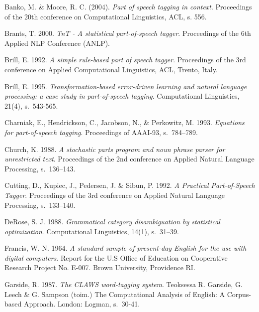 \documentclass[utf8,bachelor,manualbib]{gradu3}
\begin{document}
\begin{thebibliography}{} 

Banko, M. \& Moore, R. C. (2004). \textit{Part of speech tagging in context}. Proceedings of the 20th conference on Computational Linguistics, ACL, s. 556.

Brants, T. 2000. \textit{TnT - A statistical part-of-speech tagger}. Proceedings of the 6th Applied NLP Conference (ANLP).

Brill, E. 1992. \textit{A simple rule-based part of speech tagger}. Proceedings of the 3rd conference on Applied Computational Linguistics, ACL, Trento, Italy.

Brill, E. 1995. \textit{Transformation-based error-driven learning and natural language processing: a case study in part-of-speech tagging}. Computational Linguistics, 21(4), s.~543-565.

Charniak, E., Hendrickson, C., Jacobson, N., \& Perkowitz, M. 1993. \textit{Equations for part-of-speech tagging}. Proceedings of AAAI-93, s.~784--789.

Church, K. 1988. \textit{A stochastic parts program and noun phrase parser for unrestricted text}. Proceedings of the 2nd conference on Applied Natural Language Processing, s.~136--143.

Cutting, D., Kupiec, J., Pedersen, J. \& Sibun, P. 1992. \textit{A Practical Part-of-Speech Tagger}. Proceedings of the 3rd conference on Applied Natural Language Processing, s.~133--140.

DeRose, S. J. 1988. \textit{Grammatical category disambiguation by statistical optimization}. Computational Linguistics, 14(1), s.~31--39.

Francis, W. N. 1964. \textit{A standard sample of present-day English for the use with digital computers}. Report for the U.S Office of Education on Cooperative Research Project No. E-007.
Brown University, Providence RI.

Garside, R. 1987. \textit{The CLAWS word-tagging system}. Teoksessa R. Garside, G. Leech \& G. Sampson (toim.) The Computational Analysis of English: A Corpus-based Approach. London: Logman, s.~30-41.


\end{thebibliography}
\end{document}
